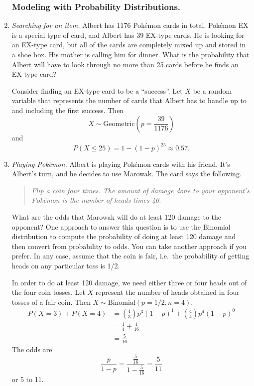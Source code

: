 \begin{enumerate}
  
\subsubsection*{Modeling with Probability Distributions.}

\item \emph{Searching for an item.} Albert has \num{1176} Pok\'{e}mon
  cards in total.  Pok\'{e}mon EX is a special type of card, and
  Albert has 39 EX-type cards.  He is looking for an EX-type card, but
  all of the cards are completely mixed up and stored in a shoe
  box. His mother is calling him for dinner.  What is the probability
  that Albert will have to look through no more than 25 cards before
  he finds an EX-type card?

\begin{solution}
\bs Consider finding an EX-type card to be a ``success''. Let $X$ be a
random variable that represents the number of cards that Albert has to
handle up to and including the first success. Then
\[
X \sim \text{Geometric}(p=\frac{39}{1176})
\]
and
\[
P(X \leq 25) = 1 - (1 - p)^{25} \approx 0.57.
\]
\end{solution}

\item \emph{Playing Pok\`{e}mon.} Albert is playing
  Pok\'{e}mon cards with his friend. It's Albert's turn, and he
  decides to use Marowak. The card says the following.
\begin{quote}
\emph{Flip a coin four times. The amount of damage done to your opponent's
Pok\'{e}mon is the number of heads times 40.}
\end{quote}
What are the odds that Marowak will do at least 120 damage to the
opponent? One approach to answer this question is to use the Binomial
distribution to compute the probability of doing at least 120 damage
and then convert from probability to odds. You can take another
approach if you prefer. In any case, assume that the coin is fair,
i.e.\ the probability of getting heads on any particular toss is 1/2.

\begin{solution}
\bs
In order to do at least 120 damage, we need either three or four heads
out of the four coin tosses. Let $X$ represent the number of heads obtained
in four tosses of a fair coin. Then $X \sim \text{Binomial}(p=1/2,n=4)$.
\begin{align*}
P(X=3) + P(X=4) &= {4 \choose 3} p^3 (1-p)^1 + {4 \choose 4} p^4 (1-p)^0 \\
&= \frac{1}{4} + \frac{1}{16} \\
&= \frac{5}{16}
\end{align*}
The odds are
\[
\frac{p}{1-p} = \frac{\frac{5}{16}}{1-\frac{5}{16}} = \frac{5}{11}
\]
or 5 to 11.
\end{solution}


\end{enumerate}
